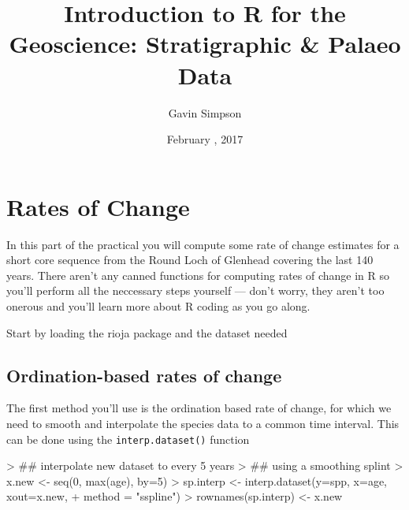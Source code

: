 \documentclass[a4paper,10pt]{article}
\newcommand{\R}{\textsf{R}\xspace}
\begin{document}
\title{Introduction to R for the Geoscience: Stratigraphic \& Palaeo Data}
\author{Gavin Simpson}
\date{February , 2017}

\maketitle

\section{Rates of Change}
In this part of the practical you will compute some rate of change estimates
for a short core sequence from the Round Loch of Glenhead covering the last 140
years. There aren't any canned functions for computing rates of change in \R so
you'll perform all the neccessary steps yourself --- don't worry, they aren't
too onerous and you'll learn more about \R coding as you go along. 

Start by loading the \textsf{rioja} package and the dataset needed
\begin{Schunk}
\end{Schunk}

\subsection{Ordination-based rates of change}
The first method you'll use is the ordination based rate of change, for which
we need to smooth and interpolate the species data to a common time interval.
This can be done using the \texttt{interp.dataset()} function
\begin{Schunk}
\begin{Sinput}
> ## interpolate new dataset to every 5 years
> ## using a smoothing splint
> x.new <- seq(0, max(age), by=5)
> sp.interp <- interp.dataset(y=spp, x=age, xout=x.new,
+                             method = "sspline")
> rownames(sp.interp) <- x.new
\end{Sinput}
\end{Schunk}
\end{document}
